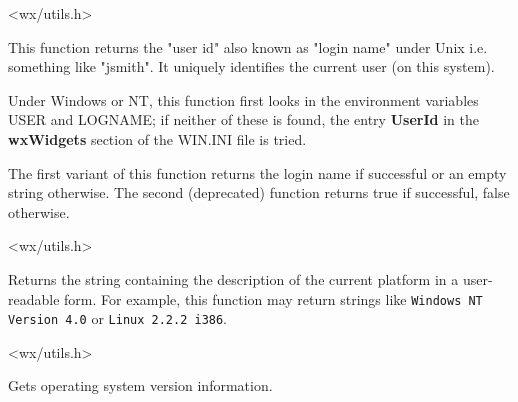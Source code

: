 


<wx/utils.h>


\label{wxgetuserid}



This function returns the "user id" also known as "login name" under Unix i.e.
something like "jsmith". It uniquely identifies the current user (on this system).

Under Windows or NT, this function first looks in the environment
variables USER and LOGNAME; if neither of these is found, the entry {\bf UserId}\rtfsp
in the {\bf wxWidgets} section of the WIN.INI file is tried.

The first variant of this function returns the login name if successful or an
empty string otherwise. The second (deprecated) function returns true
if successful, false otherwise.




<wx/utils.h>


\label{wxgetosdescription}


Returns the string containing the description of the current platform in a
user-readable form. For example, this function may return strings like
{\tt Windows NT Version 4.0} or {\tt Linux 2.2.2 i386}.




<wx/utils.h>


\label{wxgetosversion}


Gets operating system version information.

